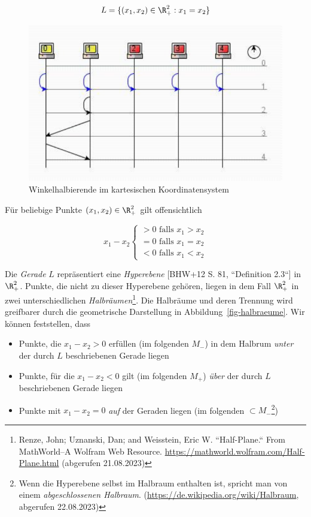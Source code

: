 \begin{equation}
L = \{(x_1, x_2) \in \R_+^2: x_1 = x_2\}
\end{equation}


\begin{figure}[h]
    \centering
    \includegraphics{images/p1ReadSeq.pdf}
    \caption{Winkelhalbierende im kartesischen Koordinatensystem}
    \label{fig-winkelhalbierende}
\end{figure}

Für beliebige Punkte $(x_1, x_2) \in \R_+^2$ gilt offensichtlich

\begin{equation}
x_1 - x_2 \begin{cases}
               > 0 \text{ falls } x_1 > x_2 \\
               = 0 \text{ falls } x_1 = x_2 \\
               < 0 \text{ falls } x_1 < x_2
\end{cases}
\end{equation}

Die \textit{Gerade} $L$ repräsentiert eine \textit{Hyperebene} [BHW+12 S. 81, ``Definition 2.3``] in $\R_+^2$.
Punkte, die nicht zu dieser Hyperebene gehören, liegen in dem Fall $\R_+^2$ in zwei unterschiedlichen \textit{Halbräumen}\footnote{
    Renze, John; Uznanski, Dan; and Weisstein, Eric W. ``Half-Plane.`` From MathWorld--A Wolfram Web Resource. \url{https://mathworld.wolfram.com/Half-Plane.html} (abgerufen 21.08.2023)
}.
Die Halbräume und deren Trennung wird greifbarer durch die geometrische Darstellung in Abbildung~\ref{fig-halbraeume}.
Wir können feststellen, dass


\begin{itemize}
    \item Punkte, die $x_1 - x_2 > 0$ erfüllen (im folgenden $M_-$) in dem Halbrum \textit{unter} der durch $L$ beschriebenen Gerade liegen
    \item Punkte, für die  $x_1 - x_2 < 0$ gilt (im folgenden $M_+$) \textit{über} der durch $L$ beschriebenen Gerade liegen
    \item Punkte mit $x_1 - x_2 = 0$ \textit{auf} der Geraden liegen (im folgenden $\subset M_-$\footnote{
        Wenn die Hyperebene selbst im Halbraum enthalten ist, spricht man von einem \textit{abgeschlossenen Halbraum}. (\url{https://de.wikipedia.org/wiki/Halbraum}, abgerufen 22.08.2023)
    })
\end{itemize}


